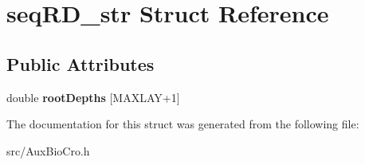 \hypertarget{structseq_r_d__str}{\section{seq\-R\-D\-\_\-str Struct Reference}
\label{structseq_r_d__str}
}
\subsection*{Public Attributes}
\begin{DoxyCompactItemize}
\item 
\hypertarget{structseq_r_d__str_ab592512393bbc9e05f905ec8cb9149c2}{double {\bfseries root\-Depths} \mbox{[}M\-A\-X\-L\-A\-Y+1\mbox{]}}\label{structseq_r_d__str_ab592512393bbc9e05f905ec8cb9149c2}

\end{DoxyCompactItemize}


The documentation for this struct was generated from the following file\-:\begin{DoxyCompactItemize}
\item 
src/Aux\-Bio\-Cro.\-h\end{DoxyCompactItemize}
